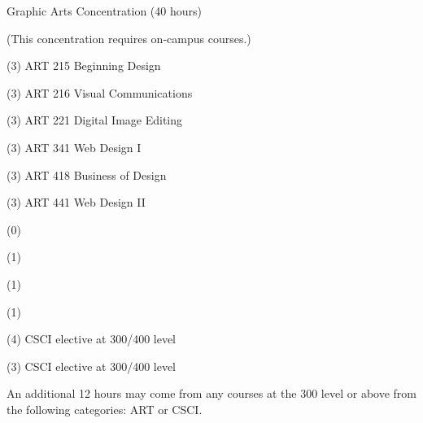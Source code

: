 \begin{reqgroup}{Graphic Arts Concentration  (40 hours)}
\begin{center}%
(This concentration requires on-campus courses.)\vspace{-0.5em}%
\end{center}%
\begin{checklist}
\begin{minipage}[t]{0.5\linewidth}
	\item (3) ART 215 Beginning Design
	\item (3) ART 216 Visual Communications
	\item (3) ART 221 Digital Image Editing
	\item (3) ART 341 Web Design I
	\item (3) ART 418 Business of Design
	\item (3) ART 441 Web Design II
\end{minipage}
\begin{minipage}[t]{0.5\linewidth}
	\item (0) 
	\item (1) 
	\item (1) 
	\item (1) 
	\item (4) CSCI elective at 300/400 level
	\item (3) CSCI elective at 300/400 level
\end{minipage}
\end{checklist}

\tcblower{}

An additional 12 hours may come from any courses at the 300 level or above from the following categories: ART or CSCI\@.
\begin{checklist}
\begin{minipage}[t]{0.5\linewidth}
	\blankReq{}
	\blankReq{}
\end{minipage}
\begin{minipage}[t]{0.5\linewidth}
	\blankReq{}
	\blankReq{}
\end{minipage}
\end{checklist}
\end{reqgroup}

